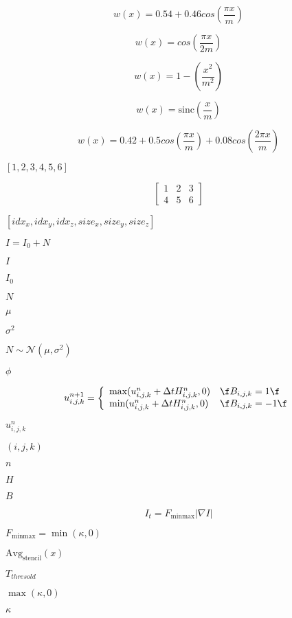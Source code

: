 \documentclass{article}
\begin{document}
\[ w(x) = 0.54 + 0.46 cos(\frac{\pi x}{m} ) \]
\pagebreak

\[ w(x) = cos(\frac{\pi x}{2 m} ) \]
\pagebreak

\[ w(x) = 1 - ( \frac{x^2}{m^2} ) \]
\pagebreak

\[ w(x) = \textrm{sinc} ( \frac{x}{m} ) \]
\pagebreak

\[ w(x) = 0.42 + 0.5 cos(\frac{\pi x}{m}) + 0.08 cos(\frac{2 \pi x}{m}) \]
\pagebreak

$[1,2,3,4,5,6]$
\pagebreak

\[ \left[\begin{array}{ccc} 1 & 2 & 3 \\ 4 & 5 & 6 \end{array}\right] \]
\pagebreak

$[idx_x, idx_y, idx_z, size_x, size_y, size_z]$
\pagebreak

$ I = I_0 + N $
\pagebreak

$ I $
\pagebreak

$ I_0 $
\pagebreak

$ N $
\pagebreak

$ \mu $
\pagebreak

$ \sigma^2 $
\pagebreak

$ N \sim \mathcal{N}(\mu, \sigma^2) $
\pagebreak

$ \phi $
\pagebreak

\[ u_{i,j,k}^{n+1} = \left\{ \begin{array}{ll} \mbox{max} (u_{i,j,k}^{n} + \Delta t H_{i,j,k}^{n}, 0) & \mbox{\f$B_{i,j,k} = 1\f$} \\ \mbox{min} (u_{i,j,k}^{n} + \Delta t H_{i,j,k}^{n}, 0) & \mbox{\f$B_{i,j,k} = -1\f$} \end{array}\right. \]
\pagebreak

$ u_{i,j,k}^{n} $
\pagebreak

$ (i,j,k) $
\pagebreak

$ n $
\pagebreak

$ H $
\pagebreak

$ B $
\pagebreak

\[ I_t = F_{\mbox{minmax}} |\nabla I| \]
\pagebreak

$ F_{\mbox{minmax}} = \min(\kappa,0) $
\pagebreak

$ \mbox{Avg}_{\mbox{stencil}}(x) $
\pagebreak

$ T_{thresold} $
\pagebreak

$ \max(\kappa,0) $
\pagebreak

$ \kappa $
\pagebreak
\end{document}
